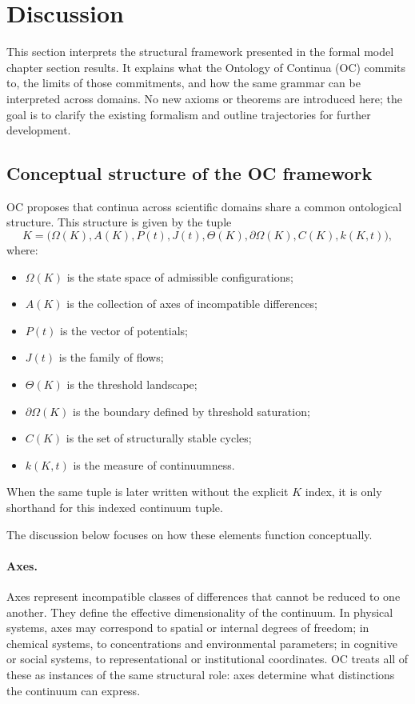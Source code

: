 
\section{Discussion}
\label{sec:discussion}

This section interprets the structural framework presented in
the formal model chapter section results. It explains what the Ontology of
Continua (OC) commits to, the limits of those commitments, and how the same
grammar can be interpreted across domains.
No new axioms or theorems are introduced here; the goal is to clarify the
existing formalism and outline trajectories for further development.

\subsection{Conceptual structure of the OC framework}

OC proposes that continua across scientific domains share a common ontological structure.
This structure is given by the tuple
\[
  K = \big(\Omega(K), A(K), P(t), J(t), \Theta(K), \partial\Omega(K), C(K), k(K,t)\big),
\]
where:
\begin{itemize}
    \item \(\Omega(K)\) is the state space of admissible configurations;
    \item \(A(K)\) is the collection of axes of incompatible differences;
    \item \(P(t)\) is the vector of potentials;
    \item \(J(t)\) is the family of flows;
    \item \(\Theta(K)\) is the threshold landscape;
    \item \(\partial\Omega(K)\) is the boundary defined by threshold saturation;
    \item \(C(K)\) is the set of structurally stable cycles;
    \item \(k(K,t)\) is the measure of continuumness.
\end{itemize}
When the same tuple is later written without the explicit \(K\) index, it is
only shorthand for this indexed continuum tuple.

The discussion below focuses on how these elements function conceptually.

\paragraph{Axes.}
Axes represent incompatible classes of differences that cannot be reduced to one another.
They define the effective dimensionality of the continuum.
In physical systems, axes may correspond to spatial or internal degrees of freedom; 
in chemical systems, to concentrations and environmental parameters; 
in cognitive or social systems, to representational or institutional coordinates.
OC treats all of these as instances of the same structural role: axes determine what distinctions the continuum can express.

